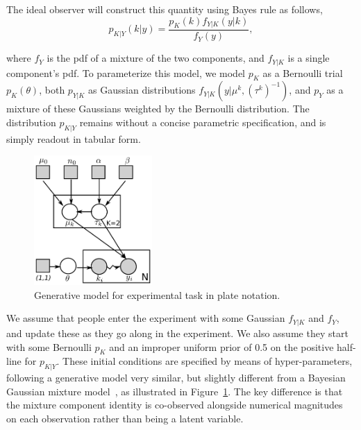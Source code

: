 \documentclass[10pt,letterpaper]{article}
\begin{document}
The ideal observer will construct this quantity using Bayes rule as follows,
\begin{equation}
    p_{K|Y}(k|y) = \frac{p_K(k)f_{Y|K}(y|k)}{f_Y(y)},
    \label{eqn:main}
\end{equation}

where $f_Y$ is the pdf of a mixture of the two components, and $f_{Y|K}$ is a single component's pdf. To parameterize this model, we model $p_K$ as a Bernoulli trial $p_K(\theta)$, both $p_{Y|K}$ as Gaussian distributions $f_{Y|K}(y|\mu^k, (\tau^k)^{-1})$, and $p_Y$ as a mixture of these Gaussians weighted by the Bernoulli distribution. The distribution $p_{K|Y}$ remains without a concise parametric specification, and is simply readout in tabular form. 





\begin{figure}
    \centering
    \includegraphics[width=0.4\textwidth]{results/model.pdf}
    \caption{Generative model for experimental task in plate notation.}
    \label{fig:model}
\end{figure}

We assume that people enter the experiment with some Gaussian $f_{Y|K}$ and $f_Y$, and update these as they go along in the experiment. We also assume they start with some Bernoulli $p_K$ and an improper uniform prior of 0.5 on the positive half-line for $p_{K|Y}$. These initial conditions are specified by means of hyper-parameters, following a generative model very similar, but slightly different from a Bayesian Gaussian mixture model~\cite{bishop2006pattern}, as illustrated in Figure~\ref{fig:model}. The key difference is that the mixture component identity is co-observed alongside numerical magnitudes on each observation rather than being a latent variable. 
\end{document}
